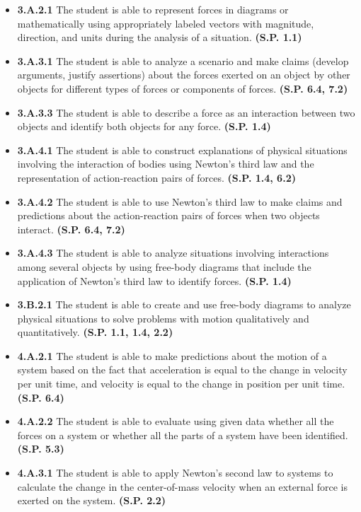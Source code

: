 \documentclass[
]{book}
\providecommand{\tightlist}{%
  \setlength{\itemsep}{0pt}\setlength{\parskip}{0pt}}
\newenvironment{learning-objectives}{}{}
\begin{document}
\begin{learning-objectives}
\begin{itemize}
\tightlist
\item
  \textbf{3.A.2.1} The student is able to represent forces in diagrams or
  mathematically using appropriately labeled vectors with magnitude,
  direction, and units during the analysis of a situation. \textbf{(S.P.
  1.1)}
\item
  \textbf{3.A.3.1} The student is able to analyze a scenario and make
  claims (develop arguments, justify assertions) about the forces
  exerted on an object by other objects for different types of forces
  or components of forces. \textbf{(S.P. 6.4, 7.2)}
\item
  \textbf{3.A.3.3} The student is able to describe a force as an
  interaction between two objects and identify both objects for any
  force. \textbf{(S.P. 1.4)}
\item
  \textbf{3.A.4.1} The student is able to construct explanations of
  physical situations involving the interaction of bodies using
  Newton's third law and the representation of action-reaction pairs
  of forces. \textbf{(S.P. 1.4, 6.2)}
\item
  \textbf{3.A.4.2} The student is able to use Newton's third law to make
  claims and predictions about the action-reaction pairs of forces
  when two objects interact. \textbf{(S.P. 6.4, 7.2)}
\item
  \textbf{3.A.4.3} The student is able to analyze situations involving
  interactions among several objects by using free-body diagrams that
  include the application of Newton's third law to identify forces.
  \textbf{(S.P. 1.4)}
\item
  \textbf{3.B.2.1} The student is able to create and use free-body diagrams
  to analyze physical situations to solve problems with motion
  qualitatively and quantitatively. \textbf{(S.P. 1.1, 1.4, 2.2)}
\item
  \textbf{4.A.2.1} The student is able to make predictions about the motion
  of a system based on the fact that acceleration is equal to the
  change in velocity per unit time, and velocity is equal to the
  change in position per unit time. \textbf{(S.P. 6.4)}
\item
  \textbf{4.A.2.2} The student is able to evaluate using given data whether
  all the forces on a system or whether all the parts of a system have
  been identified. \textbf{(S.P. 5.3)}
\item
  \textbf{4.A.3.1} The student is able to apply Newton's second law to
  systems to calculate the change in the center-of-mass velocity when
  an external force is exerted on the system. \textbf{(S.P. 2.2)}
\end{itemize}

\end{learning-objectives}
\end{document}
